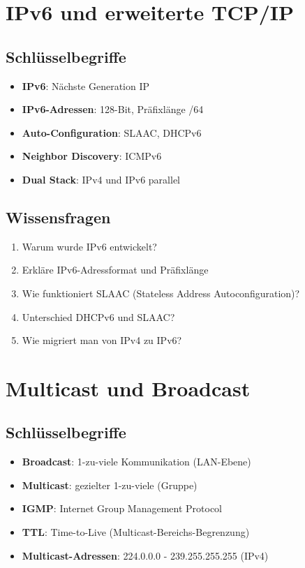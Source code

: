 \documentclass[12pt,a4paper,german]{report}
\begin{document}
\chapter{IPv6 und erweiterte TCP/IP}

\section{Schlüsselbegriffe}
\begin{itemize}
    \item \textbf{IPv6}: Nächste Generation IP
    \item \textbf{IPv6-Adressen}: 128-Bit, Präfixlänge /64
    \item \textbf{Auto-Configuration}: SLAAC, DHCPv6
    \item \textbf{Neighbor Discovery}: ICMPv6
    \item \textbf{Dual Stack}: IPv4 und IPv6 parallel
\end{itemize}

\section{Wissensfragen}
\begin{enumerate}
    \item Warum wurde IPv6 entwickelt?
    \item Erkläre IPv6-Adressformat und Präfixlänge
    \item Wie funktioniert SLAAC (Stateless Address Autoconfiguration)?
    \item Unterschied DHCPv6 und SLAAC?
    \item Wie migriert man von IPv4 zu IPv6?
\end{enumerate}

\chapter{Multicast und Broadcast}

\section{Schlüsselbegriffe}
\begin{itemize}
    \item \textbf{Broadcast}: 1-zu-viele Kommunikation (LAN-Ebene)
    \item \textbf{Multicast}: gezielter 1-zu-viele (Gruppe)
    \item \textbf{IGMP}: Internet Group Management Protocol
    \item \textbf{TTL}: Time-to-Live (Multicast-Bereichs-Begrenzung)
    \item \textbf{Multicast-Adressen}: 224.0.0.0 - 239.255.255.255 (IPv4)
\end{itemize}
\end{document}
